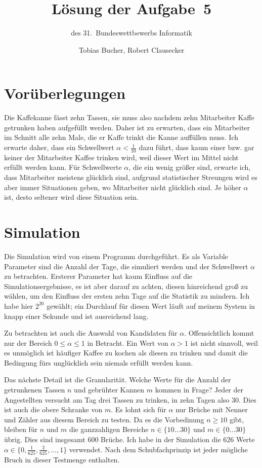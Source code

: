\documentclass{scrartcl}
\title{Lösung der Aufgabe~5}
\subtitle{des 31.~Bundeswettbewerbs Informatik}
\author{Tobias Bucher, Robert Clausecker}
\begin{document}
\maketitle
\section{Vorüberlegungen}
Die Kaffekanne fässt zehn Tassen, sie muss also nachdem zehn Mitarbeiter Kaffe
getrunken haben aufgefüllt werden. Daher ist zu erwarten, dass ein Mitarbeiter
im Schnitt alle zehn Male, die er Kaffe trinkt die Kanne auffüllen muss. Ich
erwarte daher, dass ein Schwellwert $\alpha<\frac1{10}$ dazu führt, dass kaum
einer bzw. gar keiner der Mitarbeiter Kaffee trinken wird, weil dieser Wert im
Mittel nicht erfüllt werden kann. Für Schwellwerte $\alpha$, die ein wenig
größer sind, erwarte ich, dass Mitarbeiter meistens glücklich sind, aufgrund
statistischer Streungen wird es aber immer Situationen geben, wo Mitarbeiter
nicht glücklich sind. Je höher $\alpha$ ist, desto seltener wird diese Situation
sein.

\section{Simulation}
Die Simulation wird von einem Programm durchgeführt. Es als Variable Parameter
sind die Anzahl der Tage, die simuliert werden und der Schwellwert $\alpha$ zu
betrachten. Ersterer Parameter hat kaum Einfluss auf die Simulationsergebnisse,
es ist aber darauf zu achten, diesen hinreichend groß zu wählen, um den Einfluss
der ersten zehn Tage auf die Statistik zu mindern. Ich habe hier $2^{20}$
gewählt; ein Durchlauf für diesen Wert läuft auf meinem System in knapp einer
Sekunde und ist ausreichend lang.

Zu betrachten ist auch die Auswahl von Kandidaten für $\alpha$. Offensichtlich
kommt nur der Bereich $0\le\alpha\le1$ in Betracht. Ein Wert von $\alpha>1$ ist
nicht sinnvoll, weil es unmöglich ist häufiger Kaffee zu kochen als diesen zu
trinken und damit die Bedingung fürs unglücklich sein niemals erfüllt werden
kann.

Das nächste Detail ist die Granularität. Welche Werte für die Anzahl der
getrunkenen Tassen $n$ und gebrühter Kannen $m$ kommen in Frage? Jeder der
Angestellten versucht am Tag drei Tassen zu trinken, in zehn Tagen also 30. Dies
ist auch die obere Schranke von $m$. Es lohnt sich für $\alpha$ nur Brüche mit
Nenner und Zähler aus diesem Bereich zu testen. Da es die Vorbedinung $n\ge10$
gibt, bleiben für $n$ und $m$ die ganzzahligen Bereiche $n\in\{10\dots30\}$ und
$m\in\{0\dots30\}$ übrig. Dies sind insgesamt 600 Brüche. Ich habe in der
Simulation die 626 Werte $\alpha\in\{0,\frac1{625},\frac2{625},\dots,1\}$
verwendet. Nach dem Schubfachprinzip ist jeder mögliche Bruch in dieser
Testmenge enthalten.
\end{document}
